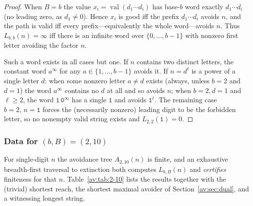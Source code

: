 \documentclass[a4paper]{article}
\theoremstyle{plain}
\theoremstyle{definition}
\theoremstyle{remark}
\DeclareMathOperator{\val}{val}
\newcommand{\Lbb}[1][b,B]{L_{#1}}
\begin{document}
\begin{proof}
When $B=b$ the value $x_i=\val(d_1\cdots d_i)$ has base-$b$ word exactly $d_1\cdots d_i$ (no leading zero, as $d_1\neq0$). Hence $x_i$ is good iff the prefix $d_1\cdots d_i$ avoids $n$, and the path is valid iff every prefix---equivalently the whole word---avoids $n$. Thus $\Lbb[b,b](n)=\infty$ iff there is an infinite word over $\{0,\dots,b-1\}$ with nonzero first letter avoiding the factor $n$.

Such a word exists in all cases but one. If $n$ contains two distinct letters, the constant word $a^{\infty}$ for any $a\in\{1,\dots,b-1\}$ avoids it. If $n=d^{\ell}$ is a power of a single letter $d$: when some nonzero letter $a\neq d$ exists (always, unless $b=2$ and $d=1$) the word $a^{\infty}$ contains no $d$ at all and so avoids $n$; when $b=2,d=1$ and $\ell\ge 2$, the word $\texttt{1}\,\texttt{0}^{\infty}$ has a single $\texttt{1}$ and avoids $\texttt{1}^{\ell}$. The remaining case $b=2,\,n=\texttt{1}$ forces the (necessarily nonzero) leading digit to be the forbidden letter, so no nonempty valid string exists and $\Lbb[2,2](\texttt{1})=0$.
\end{proof}

\subsubsection{Data for $(b,B)=(2,10)$}

For single-digit $n$ the avoidance tree $A_{2,10}(n)$ is finite, and an exhaustive breadth-first traversal to extinction both computes $\Lbb(n)$ and \emph{certifies} finiteness for that $n$. Table~\ref{av:tab:2-10} lists the results together with the (trivial) shortest reach, the shortest maximal avoider of Section~\ref{av:sec:dual}, and a witnessing longest string.
\end{document}
